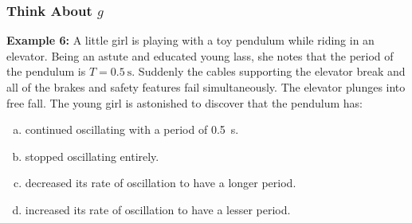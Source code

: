 \documentclass[12pt,compress,aspectratio=169]{beamer}
\begin{document}
\begin{frame}
  \frametitle{Think About $g$}
  \textbf{Example 6:} A little girl is playing with a toy pendulum while riding
  in an elevator. Being an astute and educated young lass, she notes that the 
  period of the pendulum is $T=\SI{0.5}{\second}$. Suddenly the cables
  supporting the elevator break and all  of the brakes and safety features fail
  simultaneously. The elevator plunges into free fall. The young girl is
  astonished to discover that the pendulum has:
  \begin{enumerate}[(a)]
  \item continued oscillating with a period of \SI{0.5}{\second}.
  \item stopped oscillating entirely.
  \item decreased its rate of oscillation to have a longer period.
  \item increased its rate of oscillation to have a lesser period.
  \end{enumerate}
\end{frame}
\end{document}
